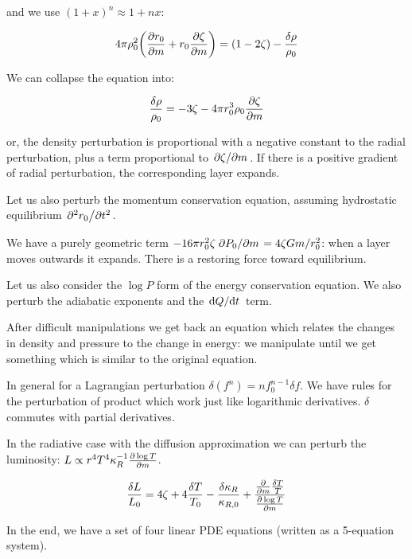 \documentclass[main.tex]{subfiles}
\begin{document}
and we use \((1+x)^n \approx 1 + nx\):

\begin{equation}
  4 \pi \rho_0^2 \qty(\pdv{r_0}{m} (1+\zeta) + r_0 \pdv{\zeta}{m})
  = (1-2 \zeta) -\frac{\delta \rho}{\rho_0}
\end{equation}

We can collapse the equation into:

\begin{equation}
  \frac{\delta \rho}{\rho_0} =
  - 3 \zeta - 4 \pi r_0^3 \rho_0 \pdv{\zeta}{m}
\end{equation}

or, the density perturbation is proportional with a negative constant to the radial perturbation, plus a term proportional to \(\pdv*{\zeta}{m}\).
If there is a positive gradient of radial perturbation, the corresponding layer expands.

Let us also perturb the momentum conservation equation, assuming hydrostatic equilibrium \(\pdv*[2]{r_0}{t} \).

We have a purely geometric term \(-16 \pi r_0^2 \zeta \pdv*{P_0}{m} = 4 \zeta Gm /r_0^2\): when a layer moves outwards it expands.
There is a restoring force toward equilibrium.

Let us also consider the \(\log P\) form of the energy conservation equation.
We also perturb the adiabatic exponents and the \(\dv*{Q}{t} \) term.

After difficult manipulations we get back an equation which relates the changes in density and pressure to the change in energy: we manipulate until we get something which is similar to the original equation.

In general for a Lagrangian perturbation \(\delta (f^n) = n f_0^{n-1} \delta f\).
We have rules for the perturbation of product which work just like logarithmic derivatives. \(\delta\) commutes with partial derivatives.

In the radiative case with the diffusion approximation we can perturb the luminosity: \(L  \propto r^4 T^4 \kappa_R^{-1} \pdv{\log T}{m}\).

\begin{equation}
  \frac{\delta L}{L_0} = 4 \zeta + 4 \frac{\delta T}{T_0} - \frac{\delta \kappa_R}{\kappa_{R,0}} + \frac{\pdv{}{m}  \frac{\delta T}{T}}{\pdv{\log T}{m}}
\end{equation}

In the end, we have a set of four linear PDE equations (written as a 5-equation system).
\end{document}
